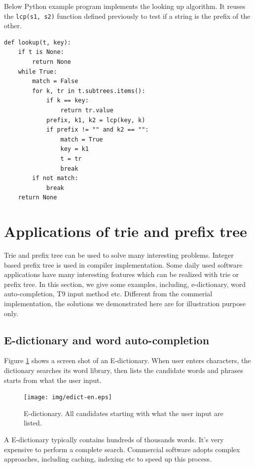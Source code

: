\documentclass[b5paper]{article}
\begin{document}
Below Python example program implements the looking up algorithm.
It reuses the \texttt{lcp(s1, s2)} function
defined previously to test if a string is the prefix of the other.

\lstset{language=Python}
\begin{lstlisting}
def lookup(t, key):
    if t is None:
        return None
    while True:
        match = False
        for k, tr in t.subtrees.items():
            if k == key:
                return tr.value
            prefix, k1, k2 = lcp(key, k)
            if prefix != "" and k2 == "":
                match = True
                key = k1
                t = tr
                break
        if not match:
            break
    return None
\end{lstlisting}


\section{Applications of trie and prefix tree}

Trie and prefix tree can be used to solve many interesting problems.
Integer based prefix tree is used in compiler implementation. Some daily
used software applications have many interesting features which can be
realized with trie or prefix tree. In this section, we give some examples,
including, e-dictionary, word auto-completion, T9
input method etc. Different from the commerial implementation, the
solutions we demonstrated here are for illustration purpose
only.

\subsection{E-dictionary and word auto-completion}
Figure \ref{fig:e-dict} shows a screen shot of an E-dictionary.
When user enters characters,
the dictionary searches its word library, then lists the candidate words and
phrases starts from what the user input.

\begin{figure}[htbp]
  \centering
  \texttt{[image: img/edict-en.eps]}
  \caption{E-dictionary. All candidates starting with what the user input are listed.}
  \label{fig:e-dict}
\end{figure}

A E-dictionary typically contains hundreds of thousands words. It's very expensive
to perform a complete search. Commercial software adopts complex approaches, including
caching, indexing etc to speed up this process.
\end{document}
